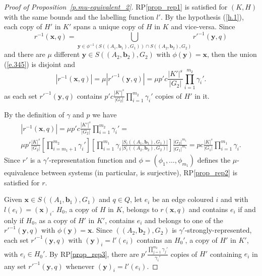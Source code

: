 \documentclass[10pt]{article}
\begin{document}
\begin{proof}[Proof of Proposition~\ref{p.mu-equivalent_2}]
RP\ref{prop_rep1} is satisfied for $(K,H)$ with the same bounds and the labelling function $l'$.
By the hypothesis (\ref{h.1}), each copy of $H'$ in $K'$ spans a unique copy of $H$ in $K$ and vice-versa.
Since
\begin{equation} \label{e.345}
	r^{-1}(\mathbf{x},q)=\bigcup_{\mathbf{y}\in \phi^{-1}(S((A_1,\mathbf{b}_1),G_1))\cap S((A_2,\mathbf{b}_2),G_2)}  r'^{-1}(\mathbf{y},q)
\end{equation}
and there are $\mu$ different $\mathbf{y}\in S((A_2,\mathbf{b}_2),G_2)$ with $\phi(\mathbf{y})=\mathbf{x}$, then the union (\ref{e.345}) is disjoint and
\begin{displaymath}
		|r^{-1}(\mathbf{x},q)|=\mu|r'^{-1}(\mathbf{y},q)|=\mu p' c\frac{|K'|^s}{|G_2|}\prod_{i=1}^{m_2} \gamma_i'.
\end{displaymath}
as each set $r'^{-1}(\mathbf{y},q)$ contains  $p' c\frac{|K'|^s}{|G_2|}\prod_{i=1}^{m_2} \gamma_i'$ copies of $H'$ in it.



By the definition of $\gamma$ and $p$ we have
\begin{multline}
		|r^{-1}(\mathbf{x},q)|=\mu p' c\frac{|K'|^s}{|G_2|}\prod_{i=1}^{m_2} \gamma_i'= \\ \mu p' \frac{|K|^{s}}{|G_2|} \left[\prod_{i=m_1+1}^{m_2} \gamma_i' \right]  \left[\prod_{i=1}^{m_1}\gamma_i\frac{|S_i((A_1,\mathbf{b}_1),G_1)|}{|S_i((A_2,\mathbf{b}_2),G_2)|} \right] \frac{|G_2|^{m_1}}{|G_1|^{m_1}}  =p c\frac{|K|^s}{|G_1|}\prod_{i=1}^{m_1} \gamma_i.
\end{multline}
Since $r'$ is a $\gamma'$-representation function and $\phi=(\phi_1,\ldots,\phi_{m_1})$ defines the $\mu$-equivalence between systems (in particular, is surjective),
RP\ref{prop_rep2} is satisfied for $r$.

Given $\mathbf{x}\in S((A_1,\mathbf{b}_1),G_1)$ and $q\in Q$, let $e_i$ be an edge coloured $i$ and with  $l(e_i)=(\mathbf{x})_i$. $H_0$, a copy of $H$ in $K$, belongs to $r( \mathbf{x},q)$ and contains $e_i$ if and only if $H_0$, as a copy of $H'$ in $K'$, contains $e_i$ and belongs to one of the $r'^{-1}(\mathbf{y},q)$ with $\phi(\mathbf{y})=\mathbf{x}$.
Since $((A_2,\mathbf{b}_2),G_2)$ is $\gamma'$-strongly-represented, each set $r'^{-1}(\mathbf{y},q)$ with $(\mathbf{y})_i=l'(e_i)$ contains an $H_0'$, a copy of $H'$ in $K'$, with $e_i\in H_0'$. By RP\ref{prop_rep3}, there are $p' \frac{\prod_{j=1}^{m_2} \gamma_j'}{\gamma_i'}$ copies of $H'$ containing $e_i$ in any set $r'^{-1}(\mathbf{y},q)$ whenever $(\mathbf{y})_i=l'(e_i)$.



\end{proof}
\end{document}
